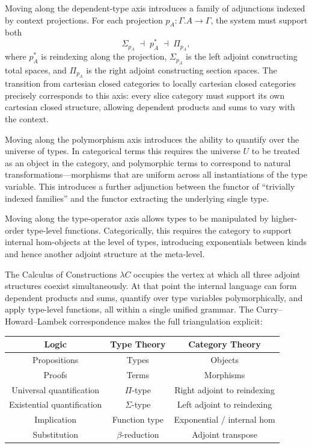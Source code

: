 \documentclass[12pt,a4paper]{article}
\theoremstyle{plain}
\theoremstyle{definition}
\begin{document}
Moving along the dependent-type axis introduces a family of adjunctions indexed by context projections. For each projection $p_A : \Gamma.A \to \Gamma$, the system must support both
\[
\Sigma_{p_A} \;\dashv\; p_A^* \;\dashv\; \Pi_{p_A},
\]
where $p_A^*$ is reindexing along the projection, $\Sigma_{p_A}$ is the left adjoint constructing total spaces, and $\Pi_{p_A}$ is the right adjoint constructing section spaces. The transition from cartesian closed categories to locally cartesian closed categories precisely corresponds to this axis: every slice category must support its own cartesian closed structure, allowing dependent products and sums to vary with the context.

Moving along the polymorphism axis introduces the ability to quantify over the universe of types. In categorical terms this requires the universe $U$ to be treated as an object in the category, and polymorphic terms to correspond to natural transformations---morphisms that are uniform across all instantiations of the type variable. This introduces a further adjunction between the functor of ``trivially indexed families'' and the functor extracting the underlying single type.

Moving along the type-operator axis allows types to be manipulated by higher-order type-level functions. Categorically, this requires the category to support internal hom-objects at the level of types, introducing exponentials between kinds and hence another adjoint structure at the meta-level.

The Calculus of Constructions $\lambda C$ occupies the vertex at which all three adjoint structures coexist simultaneously. At that point the internal language can form dependent products and sums, quantify over type variables polymorphically, and apply type-level functions, all within a single unified grammar. The Curry--Howard--Lambek correspondence makes the full triangulation explicit:
\begin{center}
\begin{tabular}{ccc}
\toprule
\textbf{Logic} & \textbf{Type Theory} & \textbf{Category Theory} \\
\midrule
Propositions & Types & Objects \\
Proofs & Terms & Morphisms \\
Universal quantification & $\Pi$-type & Right adjoint to reindexing \\
Existential quantification & $\Sigma$-type & Left adjoint to reindexing \\
Implication & Function type & Exponential / internal hom \\
Substitution & $\beta$-reduction & Adjoint transpose \\
\bottomrule
\end{tabular}
\end{center}
\end{document}
